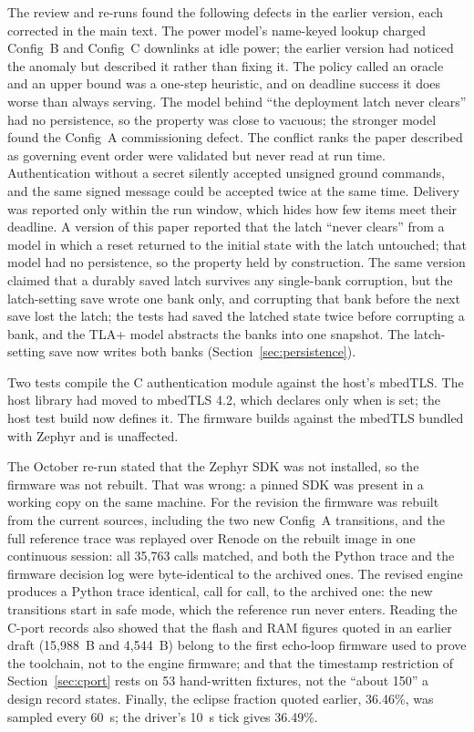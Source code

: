 \documentclass[preprint,12pt]{elsarticle}
\newcommand{\cfgA}{Config~A}
\newcommand{\cfgB}{Config~B}
\newcommand{\cfgC}{Config~C}
\begin{document}
The review and re-runs found the following defects in the earlier version, each corrected in the main text. The power model's name-keyed lookup charged \cfgB{} and \cfgC{} downlinks at idle power; the earlier version had noticed the anomaly but described it rather than fixing it. The policy called an oracle and an upper bound was a one-step heuristic, and on deadline success it does worse than always serving. The model behind ``the deployment latch never clears'' had no persistence, so the property was close to vacuous; the stronger model found the \cfgA{} commissioning defect. The conflict ranks the paper described as governing event order were validated but never read at run time. Authentication without a secret silently accepted unsigned ground commands, and the same signed message could be accepted twice at the same time. Delivery was reported only within the run window, which hides how few items meet their deadline. A version of this paper reported that the latch ``never clears'' from a model in which a reset returned to the initial state with the latch untouched; that model had no persistence, so the property held by construction. The same version claimed that a durably saved latch survives any single-bank corruption, but the latch-setting save wrote one bank only, and corrupting that bank before the next save lost the latch; the tests had saved the latched state twice before corrupting a bank, and the TLA+ model abstracts the banks into one snapshot. The latch-setting save now writes both banks (Section~\ref{sec:persistence}).

Two tests compile the C authentication module against the host's mbedTLS. The host library had moved to mbedTLS 4.2, which declares  only when  is set; the host test build now defines it. The firmware builds against the mbedTLS bundled with Zephyr and is unaffected.

The October re-run stated that the Zephyr SDK was not installed, so the firmware was not rebuilt. That was wrong: a pinned SDK was present in a working copy on the same machine. For the revision the firmware was rebuilt from the current sources, including the two new \cfgA{} transitions, and the full reference trace was replayed over Renode on the rebuilt image in one continuous session: all 35,763 calls matched, and both the Python trace and the firmware decision log were byte-identical to the archived ones. The revised engine produces a Python trace identical, call for call, to the archived one: the new transitions start in safe mode, which the reference run never enters. Reading the C-port records also showed that the flash and RAM figures quoted in an earlier draft (15,988~B and 4,544~B) belong to the first echo-loop firmware used to prove the toolchain, not to the engine firmware; and that the timestamp restriction of Section~\ref{sec:cport} rests on 53 hand-written fixtures, not the ``about 150'' a design record states. Finally, the eclipse fraction quoted earlier, 36.46\%, was sampled every 60~s; the driver's 10~s tick gives 36.49\%.



\end{document}
